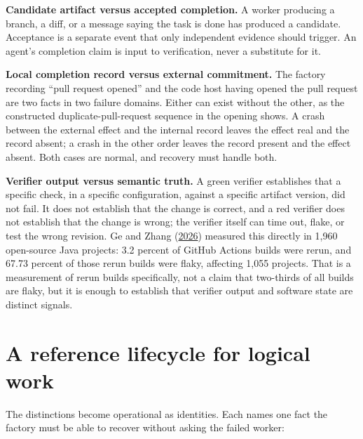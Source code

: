 \textbf{Candidate artifact versus accepted completion.} A worker producing a branch, a diff, or a message saying the task is done has produced a candidate. Acceptance is a separate event that only independent evidence should trigger. An agent's completion claim is input to verification, never a substitute for it.

\textbf{Local completion record versus external commitment.} The factory recording ``pull request opened'' and the code host having opened the pull request are two facts in two failure domains. Either can exist without the other, as the constructed duplicate-pull-request sequence in the opening shows. A crash between the external effect and the internal record leaves the effect real and the record absent; a crash in the other order leaves the record present and the effect absent. Both cases are normal, and recovery must handle both.

\textbf{Verifier output versus semantic truth.} A green verifier establishes that a specific check, in a specific configuration, against a specific artifact version, did not fail. It does not establish that the change is correct, and a red verifier does not establish that the change is wrong; the verifier itself can time out, flake, or test the wrong revision. Ge and Zhang (\href{https://arxiv.org/abs/2602.02307}{2026}) measured this directly in 1,960 open-source Java projects: 3.2 percent of GitHub Actions builds were rerun, and 67.73 percent of those rerun builds were flaky, affecting 1,055 projects. That is a measurement of rerun builds specifically, not a claim that two-thirds of all builds are flaky, but it is enough to establish that verifier output and software state are distinct signals.

\hypertarget{a-reference-lifecycle-for-logical-work}{%
\section{A reference lifecycle for logical work}\label{a-reference-lifecycle-for-logical-work}}

The distinctions become operational as identities. Each names one fact the factory must be able to recover without asking the failed worker:

